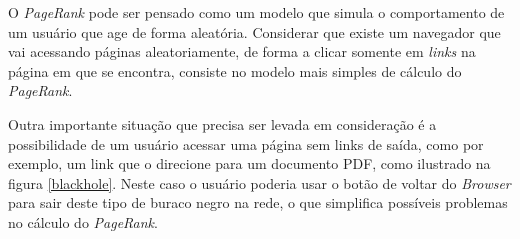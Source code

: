 O \textit{PageRank} pode ser pensado como um modelo que simula o comportamento de um usuário que age de forma aleatória. Considerar que existe um navegador que vai acessando páginas aleatoriamente, de forma a clicar somente em \textit{links} na página em que se encontra, consiste no modelo mais simples de cálculo do \textit{PageRank}. 

Outra importante situação que precisa ser levada em consideração é a possibilidade de um usuário acessar uma página sem links de saída, como por exemplo, um link que o direcione para um documento PDF, como ilustrado na figura \ref{blackhole}. Neste caso o usuário poderia usar o botão de voltar do \textit{Browser} para sair deste tipo de buraco negro na rede, o que simplifica possíveis problemas no cálculo do \textit{PageRank}.  

